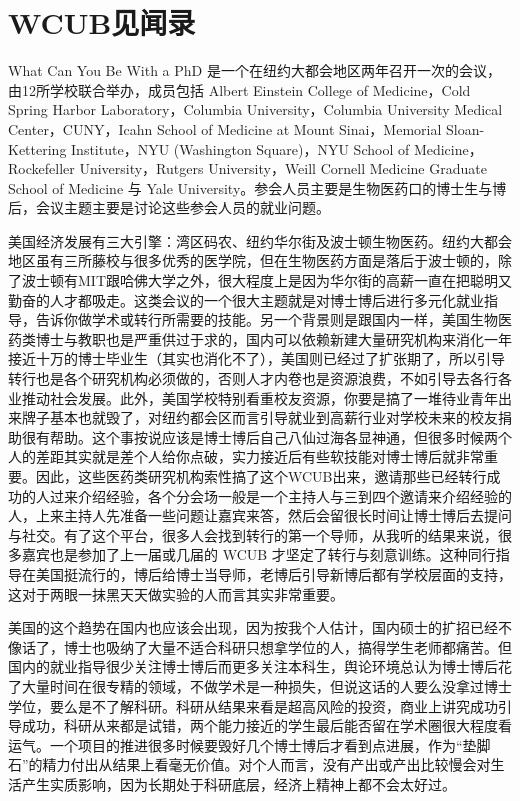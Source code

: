 \documentclass[
]{book}
\begin{document}
\hypertarget{wcubux89c1ux95fbux5f55}{%
\section{WCUB见闻录}\label{wcubux89c1ux95fbux5f55}}

What Can You Be With a PhD 是一个在纽约大都会地区两年召开一次的会议，由12所学校联合举办，成员包括 Albert Einstein College of Medicine，Cold Spring Harbor Laboratory，Columbia University，Columbia University Medical Center，CUNY，Icahn School of Medicine at Mount Sinai，Memorial Sloan- Kettering Institute，NYU (Washington Square)，NYU School of Medicine，Rockefeller University，Rutgers University，Weill Cornell Medicine Graduate School of Medicine 与 Yale University。参会人员主要是生物医药口的博士生与博后，会议主题主要是讨论这些参会人员的就业问题。

美国经济发展有三大引擎：湾区码农、纽约华尔街及波士顿生物医药。纽约大都会地区虽有三所藤校与很多优秀的医学院，但在生物医药方面是落后于波士顿的，除了波士顿有MIT跟哈佛大学之外，很大程度上是因为华尔街的高薪一直在把聪明又勤奋的人才都吸走。这类会议的一个很大主题就是对博士博后进行多元化就业指导，告诉你做学术或转行所需要的技能。另一个背景则是跟国内一样，美国生物医药类博士与教职也是严重供过于求的，国内可以依赖新建大量研究机构来消化一年接近十万的博士毕业生（其实也消化不了），美国则已经过了扩张期了，所以引导转行也是各个研究机构必须做的，否则人才内卷也是资源浪费，不如引导去各行各业推动社会发展。此外，美国学校特别看重校友资源，你要是搞了一堆待业青年出来牌子基本也就毁了，对纽约都会区而言引导就业到高薪行业对学校未来的校友捐助很有帮助。这个事按说应该是博士博后自己八仙过海各显神通，但很多时候两个人的差距其实就是差个人给你点破，实力接近后有些软技能对博士博后就非常重要。因此，这些医药类研究机构索性搞了这个WCUB出来，邀请那些已经转行成功的人过来介绍经验，各个分会场一般是一个主持人与三到四个邀请来介绍经验的人，上来主持人先准备一些问题让嘉宾来答，然后会留很长时间让博士博后去提问与社交。有了这个平台，很多人会找到转行的第一个导师，从我听的结果来说，很多嘉宾也是参加了上一届或几届的 WCUB 才坚定了转行与刻意训练。这种同行指导在美国挺流行的，博后给博士当导师，老博后引导新博后都有学校层面的支持，这对于两眼一抹黑天天做实验的人而言其实非常重要。

美国的这个趋势在国内也应该会出现，因为按我个人估计，国内硕士的扩招已经不像话了，博士也吸纳了大量不适合科研只想拿学位的人，搞得学生老师都痛苦。但国内的就业指导很少关注博士博后而更多关注本科生，舆论环境总认为博士博后花了大量时间在很专精的领域，不做学术是一种损失，但说这话的人要么没拿过博士学位，要么是不了解科研。科研从结果来看是超高风险的投资，商业上讲究成功引导成功，科研从来都是试错，两个能力接近的学生最后能否留在学术圈很大程度看运气。一个项目的推进很多时候要毁好几个博士博后才看到点进展，作为``垫脚石''的精力付出从结果上看毫无价值。对个人而言，没有产出或产出比较慢会对生活产生实质影响，因为长期处于科研底层，经济上精神上都不会太好过。
\end{document}
